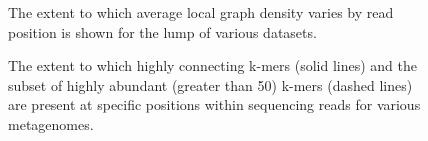 \documentclass[10pt]{article}
\begin{document}
\begin{figure}
\caption{The extent to which average local graph density varies by read position is shown for the lump of various datasets.}
\end{figure}

\begin{figure}
\caption{The extent to which highly connecting k-mers (solid lines) and the subset of highly abundant (greater than 50) k-mers (dashed lines) are present at specific positions within sequencing reads for various metagenomes.}
\end{figure}
\end{document}
